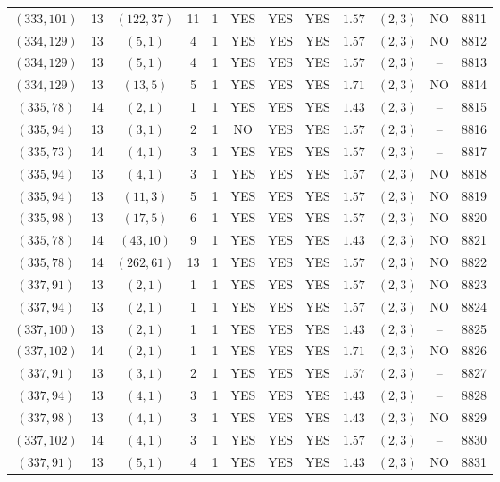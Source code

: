 \begin{longtable}{|c|c|c|c|c|c|c|c|c|c|c|c|}
$(333,101)$ & 13 & $(122,37)$ & 11 & 1 & YES & YES & YES & $1.57$ & $(2,3)$ & NO & 8811\\
$(334,129)$ & 13 & $(5,1)$ & 4 & 1 & YES & YES & YES & $1.57$ & $(2,3)$ & NO & 8812\\
$(334,129)$ & 13 & $(5,1)$ & 4 & 1 & YES & YES & YES & $1.57$ & $(2,3)$ & -- & 8813\\
$(334,129)$ & 13 & $(13,5)$ & 5 & 1 & YES & YES & YES & $1.71$ & $(2,3)$ & NO & 8814\\
$(335,78)$ & 14 & $(2,1)$ & 1 & 1 & YES & YES & YES & $1.43$ & $(2,3)$ & -- & 8815\\
$(335,94)$ & 13 & $(3,1)$ & 2 & 1 & NO & YES & YES & $1.57$ & $(2,3)$ & -- & 8816\\
$(335,73)$ & 14 & $(4,1)$ & 3 & 1 & YES & YES & YES & $1.57$ & $(2,3)$ & -- & 8817\\
$(335,94)$ & 13 & $(4,1)$ & 3 & 1 & YES & YES & YES & $1.57$ & $(2,3)$ & NO & 8818\\
$(335,94)$ & 13 & $(11,3)$ & 5 & 1 & YES & YES & YES & $1.57$ & $(2,3)$ & NO & 8819\\
$(335,98)$ & 13 & $(17,5)$ & 6 & 1 & YES & YES & YES & $1.57$ & $(2,3)$ & NO & 8820\\
$(335,78)$ & 14 & $(43,10)$ & 9 & 1 & YES & YES & YES & $1.43$ & $(2,3)$ & NO & 8821\\
$(335,78)$ & 14 & $(262,61)$ & 13 & 1 & YES & YES & YES & $1.57$ & $(2,3)$ & NO & 8822\\
$(337,91)$ & 13 & $(2,1)$ & 1 & 1 & YES & YES & YES & $1.57$ & $(2,3)$ & NO & 8823\\
$(337,94)$ & 13 & $(2,1)$ & 1 & 1 & YES & YES & YES & $1.57$ & $(2,3)$ & NO & 8824\\
$(337,100)$ & 13 & $(2,1)$ & 1 & 1 & YES & YES & YES & $1.43$ & $(2,3)$ & -- & 8825\\
$(337,102)$ & 14 & $(2,1)$ & 1 & 1 & YES & YES & YES & $1.71$ & $(2,3)$ & NO & 8826\\
$(337,91)$ & 13 & $(3,1)$ & 2 & 1 & YES & YES & YES & $1.57$ & $(2,3)$ & -- & 8827\\
$(337,94)$ & 13 & $(4,1)$ & 3 & 1 & YES & YES & YES & $1.43$ & $(2,3)$ & -- & 8828\\
$(337,98)$ & 13 & $(4,1)$ & 3 & 1 & YES & YES & YES & $1.43$ & $(2,3)$ & NO & 8829\\
$(337,102)$ & 14 & $(4,1)$ & 3 & 1 & YES & YES & YES & $1.57$ & $(2,3)$ & -- & 8830\\
$(337,91)$ & 13 & $(5,1)$ & 4 & 1 & YES & YES & YES & $1.43$ & $(2,3)$ & NO & 8831\\

\end{longtable}
